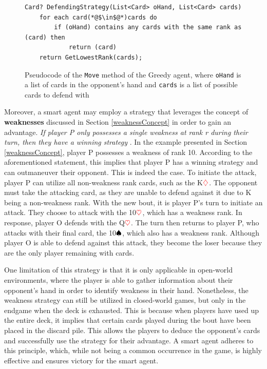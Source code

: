\begin{figure}[h]
\captionsetup{justification=centering}
\begin{lstlisting}
Card? DefendingStrategy(List<Card> oHand, List<Card> cards)
    for each card(*@$\in$@*)cards do
        if (oHand) contains any cards with the same rank as (card) then
            return (card)
    return GetLowestRank(cards);
\end{lstlisting}
\caption{Pseudocode of the \texttt{Move} method of the Greedy agent, where \texttt{oHand} is a list of cards in the opponent's hand and \texttt{cards} is a list of possible cards to defend with}
\label{fig:defStratSmart}
\end{figure}

Moreover, a smart agent may employ a strategy that leverages the concept of \textbf{weaknesses} discussed in Section \ref{weaknessConcept} in order to gain an advantage. \textit{If player P only possesses a single weakness at rank r during their turn, then they have a winning strategy} \citep{Bonnet2016TheCO}. In the example presented in Section \ref{weaknessConcept}, player P possesses a weakness of rank 10. According to the aforementioned statement, this implies that player P has a winning strategy and can outmaneuver their opponent. This is indeed the case. To initiate the attack, player P can utilize all non-weakness rank cards, such as the K$\textcolor{red}{\diamondsuit}$. The opponent must take the attacking card, as they are unable to defend against it due to K being a non-weakness rank. With the new bout, it is player P's turn to initiate an attack. They choose to attack with the 10$\textcolor{red}{\heartsuit}$, which has a weakness rank. In response, player O defends with the Q$\textcolor{red}{\heartsuit}$. The turn then returns to player P, who attacks with their final card, the 10$\textcolor{black}{\spadesuit}$, which also has a weakness rank. Although player O is able to defend against this attack, they become the loser because they are the only player remaining with cards.

One limitation of this strategy is that it is only applicable in open-world environments, where the player is able to gather information about their opponent's hand in order to identify weakness in their hand.  Nonetheless, the weakness strategy can still be utilized in closed-world games, but only in the endgame when the deck is exhausted. This is because when players have used up the entire deck, it implies that certain cards played during the bout have been placed in the discard pile. This allows the players to deduce the opponent's cards and successfully use the strategy for their advantage. A smart agent adheres to this principle, which, while not being a common occurrence in the game, is highly effective and ensures victory for the smart agent.

